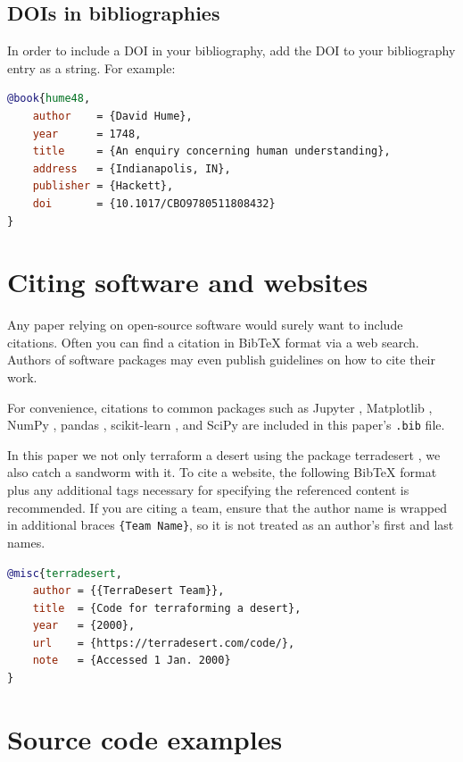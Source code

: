 \subsection{DOIs in bibliographies}\label{dois-in-bibliographies}

In order to include a DOI in your bibliography, add the DOI to your bibliography
entry as a string. For example:

\begin{lstlisting}[language=bibtex]
@book{hume48,
    author    = {David Hume},
    year      = 1748,
    title     = {An enquiry concerning human understanding},
    address   = {Indianapolis, IN},
    publisher = {Hackett},
    doi       = {10.1017/CBO9780511808432}
}
\end{lstlisting}


\section{Citing software and websites}\label{citing-software-and-websites}

Any paper relying on open-source software would surely want to include citations.
Often you can find a citation in BibTeX format via a web search.
Authors of software packages may even publish guidelines on how to cite their work.


For convenience, citations to common packages such as
Jupyter \citep{jupyter},
Matplotlib \citep{matplotlib},
NumPy \citep{numpy},
pandas \citep{pandas1,pandas2},
scikit-learn \citep{sklearn1,sklearn2}, and
SciPy \citep{scipy}
are included in this paper's \texttt{.bib} file.

In this paper we not only terraform a desert using the package terradesert \citep{terradesert}, we also catch a sandworm with it.
To cite a website, the following BibTeX format plus any additional tags necessary for specifying the referenced content is recommended.
If you are citing a team, ensure that the author name is wrapped in additional braces \texttt{\{Team Name\}}, so it is not treated as an author's first and last names.

\begin{lstlisting}[language=bibtex]
@misc{terradesert,
    author = {{TerraDesert Team}},
    title  = {Code for terraforming a desert},
    year   = {2000},
    url    = {https://terradesert.com/code/},
    note   = {Accessed 1 Jan. 2000}
}
\end{lstlisting}


\section{Source code examples}\label{source-code-examples}

